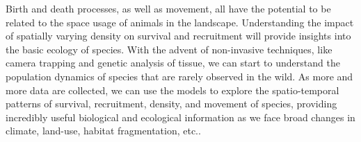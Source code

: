 Birth and death processes, as well as movement, all have the potential to be related to the space
usage of animals in the landscape.  Understanding the impact of spatially varying density on survival
and recruitment will provide insights into the basic ecology of species.  With the advent of
non-invasive techniques, like camera trapping and genetic analysis of tissue, we can start
to understand the population dynamics of species that are rarely observed in the wild.  As more and
more data are collected, we can use the models to explore the spatio-temporal patterns of survival,
recruitment, density, and movement of species, providing incredibly useful biological and ecological
information as we face broad changes in climate, land-use, habitat
fragmentation, etc.. %

